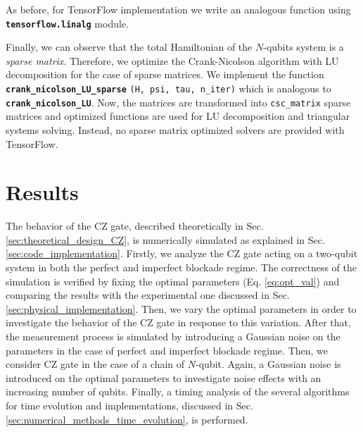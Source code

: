 \documentclass[rmp,10pt,onecolumn,fleqn,notitlepage]{revtex4-1}
\begin{document}
As before, for TensorFlow implementation we write an analogous function using {\bfseries\texttt{tensorflow.linalg}} module.

Finally, we can observe that the total Hamiltonian of the $N$-qubits system is a \textit{sparse matrix}. Therefore, we optimize the Crank-Nicolson algorithm with LU decomposition for the case of sparse matrices. We implement the function {\bfseries\texttt{crank\_nicolson\_LU\_sparse}} \texttt{(H, psi, tau, n\_iter)} which is analogous to  {\bfseries\texttt{crank\_nicolson\_LU}}. Now, the matrices are transformed into \texttt{csc\_matrix} sparse matrices and optimized functions are used for LU decomposition and triangular systems solving. Instead, no sparse matrix optimized solvers are provided with TensorFlow. 








\clearpage

\section{Results}


The behavior of the CZ gate, described theoretically in Sec. \ref{sec:theoretical_design_CZ}, is numerically simulated as explained in Sec. \ref{sec:code_implementation}. Firstly, we analyze the CZ gate acting on a two-qubit system in both the perfect and imperfect blockade regime. The correctness of the simulation is verified by fixing the optimal parameters (Eq. \eqref{eq:opt_val}) and comparing the results with the experimental one discussed in Sec. \ref{sec:physical_implementation}. Then, we vary the optimal parameters in order to investigate the behavior of the CZ gate in response to this variation. After that, the measurement process is simulated by introducing a Gaussian noise on the parameters in the case of perfect and imperfect blockade regime.
Then, we consider CZ gate in the case of a chain of $N$-qubit. Again, a Gaussian noise is introduced on the optimal parameters to investigate noise effects with an increasing number of qubits.
Finally, a timing analysis of the several algorithms for time evolution and implementations, discussed in Sec. \ref{sec:numerical_methods_time_evolution}, is performed. 
\end{document}
